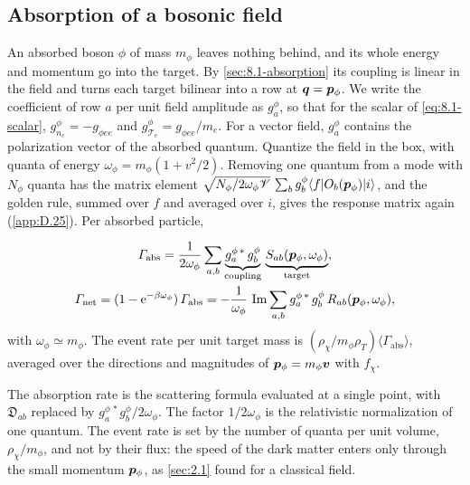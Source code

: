 \subsection{Absorption of a bosonic field}\label{sec:8.2-absorption}

An absorbed boson $\phi$ of mass $m_\phi$ leaves nothing behind, and its whole energy and momentum go into the target. By \cref{sec:8.1-absorption} its coupling is linear in the field and turns each target bilinear into a row at $\bm{q} = \bm{p}_\phi$. We write the coefficient of row $a$ per unit field amplitude as $g^\phi_a$, so that for the scalar of \cref{eq:8.1-scalar}, $g^\phi_{n_e} = -g_{\phi ee}$ and $g^\phi_{\mathcal{T}_e} = g_{\phi ee}/m_e$. For a vector field, $g^\phi_a$ contains the polarization vector of the absorbed quantum. Quantize the field in the box, with quanta of energy $\omega_\phi = m_\phi(1 + v^2/2)$. Removing one quantum from a mode with $N_\phi$ quanta has the matrix element $\sqrt{N_\phi/2\omega_\phi \mathscr{V}}\,\sum_bg^\phi_b\langle f|O_b(\bm{p}_\phi)|i\rangle$, and the golden rule, summed over $f$ and averaged over $i$, gives the response matrix again (\cref{app:D.25}). Per absorbed particle,
\begin{keyresult}
\begin{equation}
  \begin{gathered}
  \varGamma_{\mathrm{abs}} = \frac{1}{2\omega_\phi}\sum_{a,b}\underbrace{g^{\phi\,*}_a\,g^\phi_b}_{\text{coupling}}\,\underbrace{S_{ab}(\bm{p}_\phi,\omega_\phi)}_{\text{target}}, \\
  \varGamma_{\mathrm{net}} = (1 - \mathrm{e}^{-\beta\omega_\phi})\,\varGamma_{\mathrm{abs}} = -\frac{1}{\omega_\phi}\,\operatorname{Im}\sum_{a,b}g^{\phi\,*}_a\,g^\phi_b\,R_{ab}(\bm{p}_\phi,\omega_\phi) ,
  \end{gathered}
  \label{eq:8.2-abs}
\end{equation}
with $\omega_\phi \simeq m_\phi$. The event rate per unit target mass is $(\rho_\chi/m_\phi\rho_T)\langle\varGamma_{\mathrm{abs}}\rangle$, averaged over the directions and magnitudes of $\bm{p}_\phi = m_\phi\bm{v}$ with $f_\chi$.
\end{keyresult}
\noindent The absorption rate is the scattering formula evaluated at a single point, with $\mathfrak{D}_{ab}$ replaced by $g^{\phi\,*}_ag^\phi_b/2\omega_\phi$. The factor $1/2\omega_\phi$ is the relativistic normalization of one quantum. The event rate is set by the number of quanta per unit volume, $\rho_\chi/m_\phi$, and not by their flux: the speed of the dark matter enters only through the small momentum $\bm{p}_\phi$, as \cref{sec:2.1} found for a classical field.

